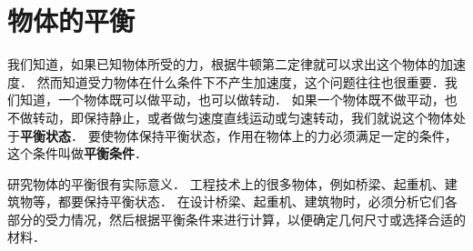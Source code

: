 \chapter{物体的平衡}\label{chapter-equilibrium-of-object}


我们知道，如果已知物体所受的力，根据牛顿第二定律就可以求出这个物体的加速度．
然而知道受力物体在什么条件下不产生加速度，这个问题往往也很重要．我们知道，一个物体既可以做平动，也可以做转动．
如果一个物体既不做平动，也不做转动，即保持静止，或者做匀速度直线运动或匀速转动，我们就说这个物体处于\textbf{平衡状态}．
要使物体保持平衡状态，作用在物体上的力必须满足一定的条件，这个条件叫做\textbf{平衡条件}．

研究物体的平衡很有实际意义．
工程技术上的很多物体，例如桥梁、起重机、建筑物等，都要保持平衡状态．
在设计桥梁、起重机、建筑物时，必须分析它们各部分的受力情况，然后根据平衡条件来进行计算，以便确定几何尺寸或选择合适的材料．

